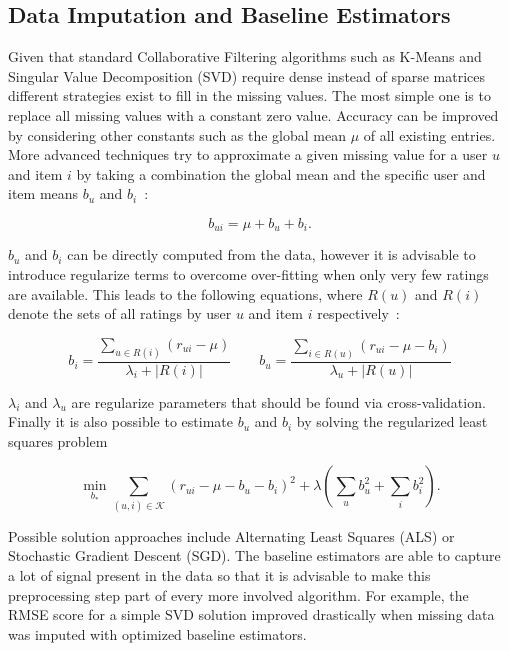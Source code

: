 \documentclass[10pt,conference,compsocconf]{IEEEtran}
\newcommand{\abs}[1]{\left\lvert#1\right\rvert}
\begin{document}
\subsection{Data Imputation and Baseline Estimators}
\label{sub:data_imputation_and_baseline_estimators}

Given that standard Collaborative Filtering algorithms such as K-Means and
Singular Value Decomposition (SVD) require dense instead of sparse matrices
different strategies exist to fill in the missing values. The most simple one is
to replace all missing values with a constant zero value. Accuracy can be
improved by considering other constants such as the global mean $\mu$ of all
existing entries.  More advanced techniques try to approximate a given missing
value for a user $u$ and item $i$ by taking a combination the global mean and
the specific user and item means $b_u$ and $b_i$~\cite{koren2008factorization,
  koren2009matrix, koren2010factor, koren2011advances}:

\begin{equation}
  b_{ui} = \mu + b_u + b_i.
\end{equation}

$b_u$ and $b_i$ can be directly computed from the data, however it is advisable
to introduce regularize terms to overcome over-fitting when only very few
ratings are available. This leads to the following equations, where $R(u)$ and
$R(i)$ denote the sets of all ratings by user $u$ and item $i$
respectively~\cite{koren2008factorization, koren2009matrix, koren2010factor,
  koren2011advances}:

\begin{equation}
  b_i = \frac{\sum_{u \in R(i)} (r_{ui} - \mu)}{\lambda_i + \abs{R(i)}}\qquad
  b_u = \frac{\sum_{i \in R(u)} (r_{ui} - \mu - b_i)}{\lambda_u + \abs{R(u)}}
\end{equation}

$\lambda_i$ and $\lambda_u$ are regularize parameters that should be found via
cross-validation. Finally it is also possible to estimate $b_u$ and $b_i$ by
solving the regularized least squares problem~\cite{koren2008factorization,
  koren2009matrix, koren2010factor, koren2011advances}

\begin{equation}
  \min_{b_*} \sum_{(u,i) \in \mathcal K} {(r_{ui} - \mu - b_u - b_i)}^2 +
  \lambda \left( \sum_u b_u^2 + \sum_i b_i^2 \right ).
\end{equation}

Possible solution approaches include Alternating Least Squares (ALS) or
Stochastic Gradient Descent (SGD). The baseline estimators are able to capture a
lot of signal present in the data so that it is advisable to make this
preprocessing step part of every more involved algorithm. For example, the RMSE
score for a simple SVD solution improved drastically when missing data was
imputed with optimized baseline estimators.
\end{document}
